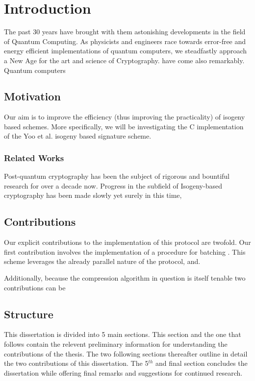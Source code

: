 \chapter{Introduction}

The past 30 years have brought with them astonishing developments in the field of Quantum Computing. As physicists and engineers race towards error-free and energy efficient implementations of quantum computers, we steadfastly approach a New Age for the art and science of Cryptography.  have come also remarkably. Quantum computers 

\section{Motivation}

Our aim is to improve the efficiency (thus improving the practicality) of isogeny based schemes. More specifically, we will be investigating the C implementation of the Yoo et al. isogeny based signature scheme. 

\subsection{Related Works}

Post-quantum cryptography has been the subject of rigorous and bountiful research for over a decade now. Progress in the subfield of Isogeny-based cryptography has been made slowly yet surely in this time,  

\section{Contributions}

Our explicit contributions to the implementation of this protocol are twofold. Our first contribution involves the implementation of a procedure for batching . This scheme leverages the already parallel nature of the protocol, and.

Additionally, because the compression algorithm in question is itself tenable two contributions can be 


\section{Structure}

This dissertation is divided into 5 main sections. This section and the one that follows contain the relevent preliminary information for understanding the contributions of the thesis. The two following sections thereafter outline in detail the two contributions of this dissertation. The 5$^{th}$ and final section concludes the dissertation while offering final remarks and suggestions for continued research. 


